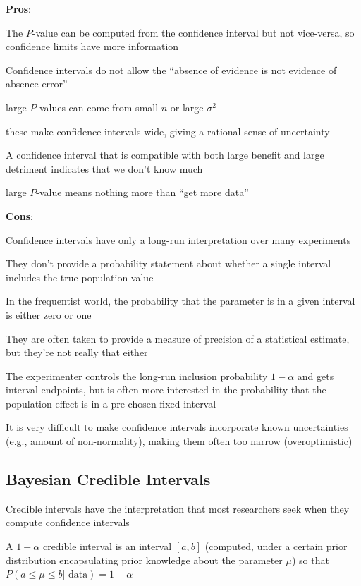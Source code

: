 \textbf{Pros}:
\bi
\item The $P$-value can be computed from the confidence interval but not vice-versa, so confidence limits have more information
\item Confidence intervals do not allow the ``absence of evidence is not evidence of absence error''
  \bi
  \item large $P$-values can come from small $n$ or large $\sigma^2$
  \item these make confidence intervals wide, giving a rational sense of uncertainty 
  \item A confidence interval that is compatible with both large benefit and large detriment indicates that we don't know much
    \bi
    \item large $P$-value means nothing more than ``get more data''
    \ei
\ei
\ei

\textbf{Cons}:
\bi
\item Confidence intervals have only a long-run interpretation over many experiments
\item They don't provide a probability statement about whether a single interval includes the true population value
  \bi
  \item In the frequentist world, the probability that the parameter is in a given interval is either zero or one
  \ei
\item They are often taken to provide a measure of precision of a statistical estimate, but they're not really that either
\item The experimenter controls the long-run inclusion probability $1 - \alpha$ and gets interval endpoints, but is often more interested in the probability that the population effect is in a pre-chosen fixed interval
\item It is very difficult to make confidence intervals incorporate known uncertainties (e.g., amount of non-normality), making them often too narrow (overoptimistic)
\ei  
 
\subsection{Bayesian Credible Intervals}
\bi
\item Credible intervals have the interpretation that most researchers seek when they compute confidence intervals
\item A $1 - \alpha$ credible interval is an interval $[a, b]$ (computed, under a certain prior distribution encapsulating prior knowledge about the parameter $\mu$) so that \\ $P(a \leq \mu \leq b | \textrm{ data}) = 1 - \alpha$
\ei

